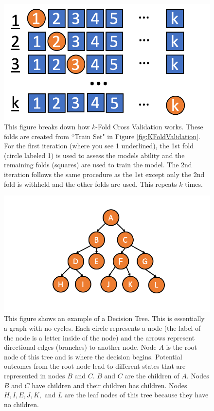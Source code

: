\begin{figure}[!htb]
    \centering
      \centering
      \includegraphics[width=\textwidth]{figures/ppt/KFoldValidationExplain.png}
     
    
    \caption{
	This figure breaks down how \(k\)-Fold Cross Validation works. These folds are created from ``Train Set" in Figure \ref{fig:KFoldValidation}. For the first iteration (where you see 1 underlined), the 1st fold (circle labeled 1) is used to assess the models ability and the remaining folds (squares) are used to train the model. The 2nd iteration follows the same procedure as the 1st except only the 2nd fold is withheld and the other folds are used. This repeats \(k\) times.
      }
\label{fig:KFoldValidationExplain}
  \end{figure}


\begin{figure}[!htb]
    \centering
      \centering
      \includegraphics[width=\textwidth]{figures/ppt/DecisionTree.png}

    \caption{
	This figure shows an example of a Decision Tree. This is essentially a graph with no cycles.  Each circle represents a node (the label of the node is a letter inside of the node) and the arrows represent directional edges (branches) to another node. Node \(A\) is the root node of this tree and is where the decision begins. Potential outcomes from the root node lead to different states that are represented in nodes \(B\) and \(C\). \(B\) and \(C\) are the children of \(A\).  Nodes \(B\) and \(C\) have children and their children has children. Nodes \(H, I, E, J, K,\) and \(L\) are the leaf nodes of this tree because they have no children.
      }
      \label{fig:DecisionTree}
  \end{figure}

\clearpage

